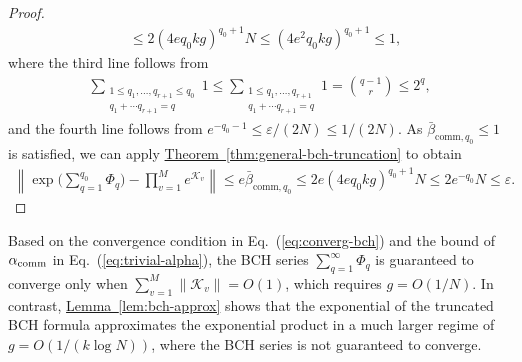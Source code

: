 \documentclass[11pt]{article}
\newcommand{\eq}[1]{(\ref{eq:#1})}
\newcommand{\thm}[1]{\hyperref[thm:#1]{Theorem~\ref*{thm:#1}}}
\newcommand{\lem}[1]{\hyperref[lem:#1]{Lemma~\ref*{lem:#1}}}
\renewcommand{\comm}{\mathrm{comm}}
\newcommand{\eps}{\varepsilon}
\newcommand{\mc}{\mathcal}
\begin{document}
\begin{proof}
\begin{align*}
    &\le 2(4eq_0kg)^{q_0+1}N \le (4e^2q_0 kg)^{q_0+1}\le 1,
\end{align*}
where the third line follows from 
\begin{align*}
    \sum_{\substack{1\le q_1, \ldots, q_{r+1}\le q_0\\q_1+\cdots q_{r+1}=q}}1\le  \sum_{\substack{1\le q_1, \ldots, q_{r+1}\\q_1+\cdots q_{r+1}=q}}1=\binom{q-1}{r}\le 2^q,
\end{align*}
and the fourth line follows from $e^{-q_0-1} \le \eps/(2N) \le 1/(2N)$.
As $\bar{\beta}_{\comm,q_0}\le 1$ is satisfied, we can apply \thm{general-bch-truncation} to obtain 
\begin{align*}
\left\|\exp\Big(\sum_{q=1}^{q_0} \Phi_q\Big) - \prod_{v = 1}^Me^{\mc K_v} \right\|
\le  e\bar{\beta}_{\comm,q_0}
\le 2e(4eq_0kg)^{q_0+1}N\le 2e^{-q_0}N\le \eps.
\end{align*}
\end{proof}
Based on the convergence condition in Eq.~\eq{converg-bch} and the bound of $\alpha_{\rm comm}$ in Eq.~\eq{trivial-alpha}, the BCH series $\sum_{q=1}^{\infty} \Phi_q$ is guaranteed to converge only when $\sum_{v=1}^M \|\mc K_v\| = O(1)$, which requires $g = O(1/N)$. In contrast, \lem{bch-approx}  shows that the exponential of the truncated BCH formula approximates the exponential product in a much larger regime of $g = O(1/(k\log N))$, where the BCH series is not guaranteed to converge. 

\end{document}
